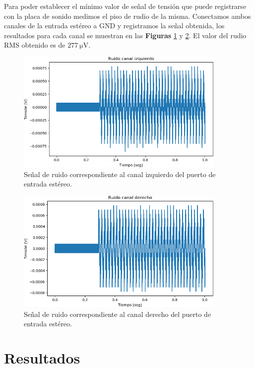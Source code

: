 \documentclass[a4paper,11pt]{article}
\begin{document}
Para poder establecer el mínimo valor de señal de tensión que puede
registrarse con la placa de sonido medimos el piso de rudio de la misma.
Conectamos ambos canales de la entrada estéreo a GND y registramos la
señal obtenida, los resultados para cada canal se muestran en las
\textbf{Figuras} \ref{fig:RuidoIzquierdo} y \ref{fig:RuidoDerecho}.
El valor del rudio RMS obtenido es de $\SI{277}{\uV}$.

	\begin{figure}[h]
		\centering
		\includegraphics[width=0.9\textwidth]{imagenes/RuidoCanalIzquierdo.png}
		\caption{Señal de ruido correspondiente al canal izquierdo del
puerto de entrada estéreo.}
        \label{fig:RuidoIzquierdo}
	\end{figure}
	
	\begin{figure}[h]
		\centering
		\includegraphics[width=0.9\textwidth]{imagenes/RuidoCanalDerecho.png}
		\caption{Señal de ruido correspondiente al canal derecho del
puerto de entrada estéreo.}
        \label{fig:RuidoDerecho}
	\end{figure}
\clearpage

\section{Resultados}
\label{sec:resultados}
\end{document}
